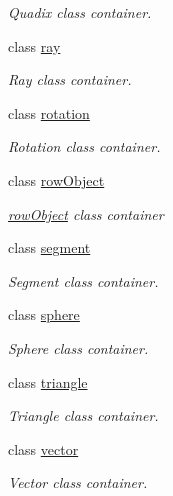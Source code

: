 \begin{DoxyCompactItemize}
\begin{DoxyCompactList}\small\item\em Quadix class container. \end{DoxyCompactList}\item 
class \hyperlink{classddd_1_1ray}{ray}
\begin{DoxyCompactList}\small\item\em Ray class container. \end{DoxyCompactList}\item 
class \hyperlink{classddd_1_1rotation}{rotation}
\begin{DoxyCompactList}\small\item\em Rotation class container. \end{DoxyCompactList}\item 
class \hyperlink{classddd_1_1row_object}{row\+Object}
\begin{DoxyCompactList}\small\item\em \hyperlink{classddd_1_1row_object}{row\+Object} class container \end{DoxyCompactList}\item 
class \hyperlink{classddd_1_1segment}{segment}
\begin{DoxyCompactList}\small\item\em Segment class container. \end{DoxyCompactList}\item 
class \hyperlink{classddd_1_1sphere}{sphere}
\begin{DoxyCompactList}\small\item\em Sphere class container. \end{DoxyCompactList}\item 
class \hyperlink{classddd_1_1triangle}{triangle}
\begin{DoxyCompactList}\small\item\em Triangle class container. \end{DoxyCompactList}\item 
class \hyperlink{classddd_1_1vector}{vector}
\begin{DoxyCompactList}\small\item\em Vector class container. \end{DoxyCompactList}\end{DoxyCompactItemize}
